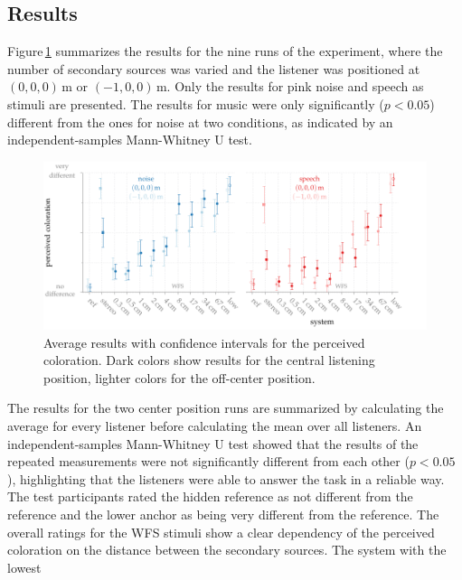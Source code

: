 \subsection{Results}
\label{sec:coloration_results}
%
Figure\,\ref{fig:wfs_coloration_results} summarizes the results for the nine
runs of the experiment, where the number of secondary sources was varied and the
listener was positioned at $(0,0,0)$\,m or $(-1,0,0)$\,m. Only the results for
pink noise and speech as stimuli are presented. The results for music
were only significantly ($p<0.05$)
different from the ones for
noise at two conditions, as indicated by an independent-samples Mann-Whitney U test.
%
\begin{figure}[t]
    \centering
    \includegraphics{fig5_10/fig5_10}
    \caption{Average results with confidence intervals for the perceived
    coloration. Dark colors show results for the central listening position,
    lighter colors for the off-center position.
    }
    \label{fig:wfs_coloration_results}
\end{figure}
%
The results for the two center position runs are summarized by calculating the
average for every listener before calculating the mean over all listeners. An
independent-samples Mann-Whitney U test showed that the results of the repeated
measurements were not significantly different from each other ($p<0.05$), highlighting that
the listeners were able to answer the task in a reliable way.
The test participants rated the hidden reference as not different from the
reference and the lower anchor as being very different from the reference. The overall
ratings for the \ac{WFS} stimuli show a clear dependency of the perceived
coloration on the distance between the secondary sources. The system with the lowest
